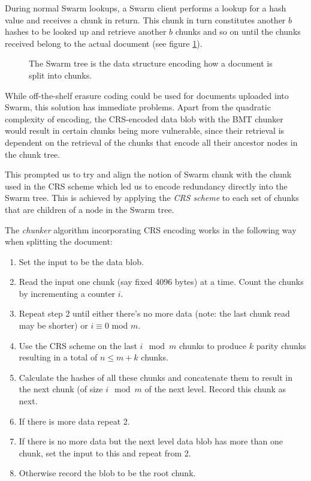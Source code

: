 During normal Swarm lookups, a Swarm client performs a lookup for a hash value and receives a chunk in return. This chunk in turn constitutes another $b$ hashes to be looked up and retrieve another $b$ chunks and so on until the chunks received belong to the actual document (see figure \ref{fig:Swarm-hash-split}).


\begin{figure}[htbp]
   \centering
   
   \caption[Swarm hash split \statusgreen]{The Swarm tree is the data structure encoding how a document is split into chunks.}
   \label{fig:Swarm-hash-split}
\end{figure}

While off-the-shelf erasure coding could be used for documents uploaded into Swarm, this solution has immediate problems. Apart from the quadratic complexity of encoding,  the CRS-encoded data blob with the BMT chunker would result in certain chunks being more vulnerable, since their retrieval is dependent on the retrieval of the chunks that encode all their ancestor nodes in the chunk tree.

This prompted us to try and align the notion of Swarm chunk with the chunk used in the CRS scheme which led us to encode redundancy directly into the Swarm tree. This is achieved by applying the \emph{CRS scheme} to each set of chunks that are children of a node in the Swarm tree.

The \emph{chunker} algorithm incorporating CRS encoding works in the following way when splitting the document:

\begin{enumerate}
\item Set the input to be the data blob.
\item Read the input one chunk (say fixed 4096 bytes) at a time. Count the chunks by incrementing a counter $i$. 
\item Repeat step 2 until either there's no more data (note: the last chunk read may be shorter) or $i \equiv 0$ mod $m$.
\item Use the CRS scheme on the last $i \mod m$ chunks to produce $k$ parity chunks resulting in a total of $n \leq m+k$ chunks.
\item Calculate the hashes of all these chunks and concatenate them to result in the next chunk (of size $i\mod m$ of the next level. Record this chunk as next.
\item If there is more data repeat 2. 
\item If there is no more data but the next level data blob has more than one chunk, set the input to this and repeat from 2.
\item Otherwise record the blob to be the root chunk.
\end{enumerate}

